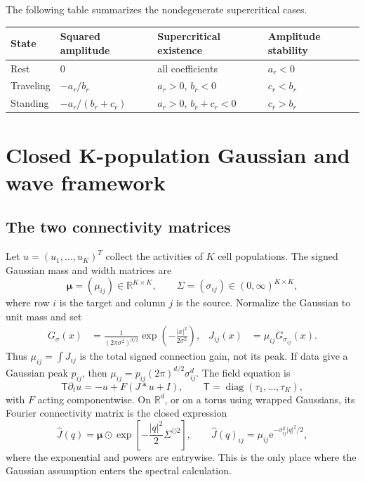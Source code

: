\documentclass[11pt]{article}
\newcommand{\ee}{\mathrm{e}}
\newcommand{\T}{\mathsf T}
\newcommand{\Mu}{\bm{\mu}}
\begin{document}
The following table summarizes the nondegenerate supercritical cases.

\begin{center}
\begin{tabular}{@{}llll@{}}
\toprule
State & Squared amplitude & Supercritical existence & Amplitude stability\\
\midrule
Rest & $0$ & all coefficients & $a_r<0$\\
Traveling & $-a_r/b_r$ & $a_r>0$, $b_r<0$ & $c_r<b_r$\\
Standing & $-a_r/(b_r+c_r)$ & $a_r>0$, $b_r+c_r<0$ & $c_r>b_r$\\
\bottomrule
\end{tabular}
\end{center}



\section{Closed K-population Gaussian and wave framework}
\label{sec:K-framework}

\subsection{The two connectivity matrices}

Let $u=(u_1,\ldots,u_K)^T$ collect the activities of $K$ cell populations.
The signed Gaussian mass and width matrices are
\begin{equation}
 \Mu=(\mu_{ij})\in\mathbb R^{K\times K},\qquad
 \Sigma=(\sigma_{ij})\in(0,\infty)^{K\times K},
\end{equation}
where row $i$ is the target and column $j$ is the source.  Normalize the
Gaussian to unit mass and set
\begin{align}
 G_\sigma(x)&=\frac{1}{(2\pi\sigma^2)^{d/2}}
 \exp\!\left(-\frac{|x|^2}{2\sigma^2}\right),
 &J_{ij}(x)&=\mu_{ij}G_{\sigma_{ij}}(x).
 \label{eq:gaussian}
\end{align}
Thus $\mu_{ij}=\int J_{ij}$ is the total signed connection gain, not its peak.
If data give a Gaussian peak $p_{ij}$, then
$\mu_{ij}=p_{ij}(2\pi)^{d/2}\sigma_{ij}^{d}$.  The field equation is
\begin{equation}
 \T\partial_tu=-u+F(J*u+I),\qquad
 \T=\operatorname{diag}(\tau_1,\ldots,\tau_K),
 \label{eq:field}
\end{equation}
with $F$ acting componentwise.  On $\mathbb R^d$, or on a torus using wrapped
Gaussians, its Fourier connectivity matrix is the closed expression
\begin{equation}
 \widehat J(q)=\Mu\odot
 \exp\!\left[-\frac{|q|^2}{2}\Sigma^{\odot2}\right],
 \qquad
 \widehat J(q)_{ij}=\mu_{ij}\ee^{-\sigma_{ij}^2|q|^2/2},
 \label{eq:gaussian-symbol}
\end{equation}
where the exponential and powers are entrywise.  This is the only place where
the Gaussian assumption enters the spectral calculation.
\end{document}
